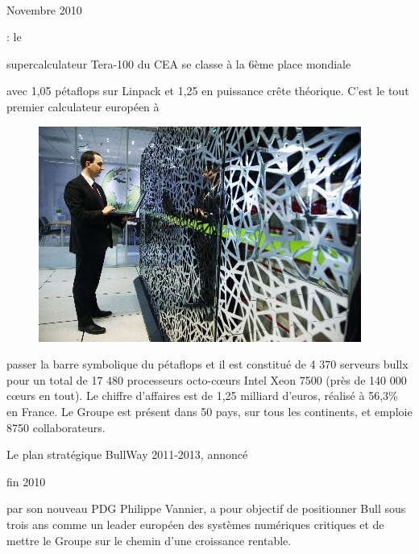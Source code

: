 \documentclass[11pt]{article}
\begin{document}
		\paragraph{}
		\begin{bf}Novembre 2010\end{bf} : le \begin{bf}supercalculateur Tera-100 du CEA se classe à la 6ème place mondiale\end{bf} 
		avec 1,05 pétaflops sur Linpack et 1,25 en puissance crête théorique. C'est le tout premier calculateur européen à 
		\begin{figure}
		\includegraphics{tera_100.jpg}
		\end{figure}
		passer la barre symbolique du pétaflops et il est constitué de 4 370 serveurs bullx pour un total de 17 480 processeurs 
		octo-cœurs Intel Xeon 7500 (près de 140 000 cœurs en tout). Le chiffre d’affaires est de 1,25 milliard d’euros, 
		réalisé à 56,3\% en France. Le Groupe est présent dans 50 pays, sur tous les continents, et emploie 8750 collaborateurs.

		Le plan stratégique BullWay 2011-2013, annoncé \begin{bf}fin 2010\end{bf} par son nouveau PDG Philippe Vannier, a 
		pour objectif de positionner Bull sous trois ans comme un leader européen des systèmes numériques critiques et de 
		mettre le Groupe sur le chemin d’une croissance rentable.
\end{document}
